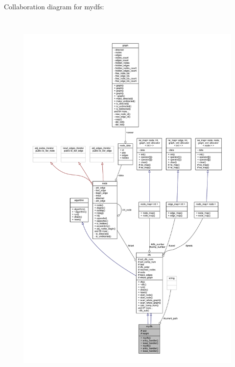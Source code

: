 Collaboration diagram for mydfs\+:\nopagebreak
\begin{figure}[H]
\begin{center}
\leavevmode
\includegraphics[height=550pt]{classmydfs__coll__graph}
\end{center}
\end{figure}
